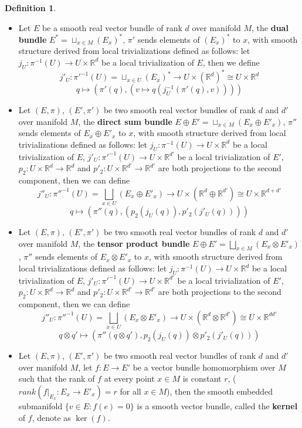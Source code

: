 \documentclass{article}
\theoremstyle{definition}
\newtheorem{dfn}[thm]{Definition}
\begin{document}
\begin{dfn}\label{constvb}
    \begin{itemize}
        \item Let $E$ be a smooth real vector bundle of rank $d$ over manifold $M$, the {\bf dual bundle} $E^*=\sqcup_{x\in M}(E_x)^*$, $\pi'$ sends elements of $(E_x)^*$ to $x$, with smooth structure derived from local trivializations defined as follows: let $j_U: \pi^{-1}(U)\rightarrow U\times\mathbb{R}^d$ be a local trivialization of $E$, then we define
        \[j'_U: \pi'^{-1}(U)=\sqcup_{x\in U}(E_x)^*\rightarrow U\times (\mathbb{R}^d)^*\cong U\times \mathbb{R}^d\]
        \[q\mapsto (\pi'(q), (v\mapsto q(j_U^{-1}(\pi'(q), v))))\]
        \item Let $(E, \pi)$, $(E', \pi')$ be two smooth real vector bundles of rank $d$ and $d'$ over manifold $M$, the {\bf direct sum bundle} $E\oplus E'=\sqcup_{x\in M}(E_x\oplus E'_x)$, $\pi''$ sends elements of $E_x\oplus E'_x$ to $x$, with smooth structure derived from local trivializations defined as follows: let $j_U: \pi^{-1}(U)\rightarrow U\times\mathbb{R}^d$ be a local trivialization of $E$, $j'_U: \pi'^{-1}(U)\rightarrow U\times\mathbb{R}^{d'}$ be a local trivialization of $E'$, $p_2: U\times\mathbb{R}^d\rightarrow\mathbb{R}^d$ and $p'_2: U\times\mathbb{R}^{d'}\rightarrow\mathbb{R}^{d'}$ are both projections to the second component, then we can define
        \[j''_U: \pi''^{-1}(U)=\bigsqcup_{x\in U}(E_x\oplus E'_x)\rightarrow U\times (\mathbb{R}^d\oplus\mathbb{R}^{d'})\cong U\times \mathbb{R}^{d+d'}\]
        \[q\mapsto (\pi''(q), (p_2(j_U(q)), p'_2(j'_U(q))))\]
        \item Let $(E, \pi)$, $(E', \pi')$ be two smooth real vector bundles of rank $d$ and $d'$ over manifold $M$, the {\bf tensor product bundle} $E\oplus E'=\bigsqcup_{x\in M}(E_x\otimes E'_x)$, $\pi''$ sends elements of $E_x\otimes E'_x$ to $x$, with smooth structure derived from local trivializations defined as follows: let $j_U: \pi^{-1}(U)\rightarrow U\times\mathbb{R}^d$ be a local trivialization of $E$, $j'_U: \pi'^{-1}(U)\rightarrow U\times\mathbb{R}^{d'}$ be a local trivialization of $E'$, $p_2: U\times\mathbb{R}^d\rightarrow\mathbb{R}^d$ and $p'_2: U\times\mathbb{R}^{d'}\rightarrow\mathbb{R}^{d'}$ are both projections to the second component, then we can define
        \[j''_U: \pi''^{-1}(U)=\bigsqcup_{x\in U}(E_x\otimes E'_x)\rightarrow U\times (\mathbb{R}^d\otimes\mathbb{R}^{d'})\cong U\times \mathbb{R}^{dd'}\]
        \[q\otimes q'\mapsto (\pi''(q\otimes q'), p_2(j_U(q))\otimes p'_2(j'_U(q)))\]
        \item Let $(E, \pi)$, $(E', \pi')$ be two smooth real vector bundles of rank $d$ and $d'$ over manifold $M$, let $f: E\rightarrow E'$ be a vector bundle homomorphism over $M$ such that the rank of $f$ at every point $x\in M$ is constant $r$, ($rank(f|_{E_x}: E_x\rightarrow E'_x)=r$ for all $x\in M$), then the smooth embedded submanifold $\{v\in E: f(e)=0\}$ is a smooth vector bundle, called the {\bf kernel} of $f$, denote as $\ker(f)$.
    \end{itemize}
\end{dfn}
\end{document}
